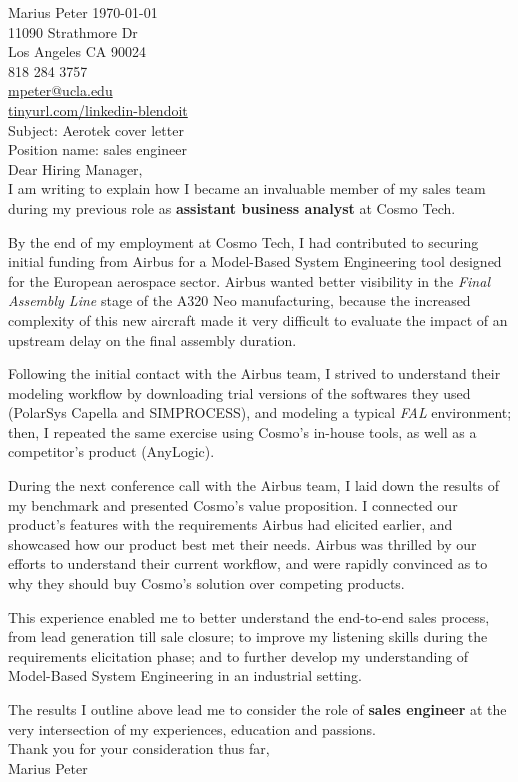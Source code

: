 \documentclass[12pt]{article}
\begin{document}
\noindent Marius Peter \hfill \today\\
11090 Strathmore Dr\\
Los Angeles CA 90024\\
818 284 3757\\
\href{mailto:mpeter@ucla.edu}{mpeter@ucla.edu}\\
\url{tinyurl.com/linkedin-blendoit}\\[0.4cm]


\noindent Subject: Aerotek cover letter\\
Position name: sales engineer\\
\vfill
Dear Hiring Manager,\\[0.4cm]

I am writing to explain how I became an invaluable member of my sales team during my previous role as \textbf{assistant business analyst} at Cosmo Tech.

By the end of my employment at Cosmo Tech, I had contributed to securing initial funding from Airbus for a Model-Based System Engineering tool designed for the European aerospace sector.
Airbus wanted better visibility in the \textit{Final Assembly Line} stage of the A320 Neo manufacturing, because the increased complexity of this new aircraft made it very difficult to evaluate the impact of an upstream delay on the final assembly duration.

Following the initial contact with the Airbus team, I strived to understand their modeling workflow by downloading trial versions of the softwares they used (PolarSys Capella and SIMPROCESS), and modeling a typical \textit{FAL} environment;
then, I repeated the same exercise using Cosmo's in-house tools, as well as a competitor's product (AnyLogic).

During the next conference call with the Airbus team, I laid down the results of my benchmark and presented Cosmo's value proposition.
I connected our product's features with the requirements Airbus had elicited earlier, and showcased how our product best met their needs.
Airbus was thrilled by our efforts to understand their current workflow, and were rapidly convinced as to why they should buy Cosmo's solution over competing products.

This experience enabled me to better understand the end-to-end sales process, from lead generation till sale closure;
to improve my listening skills during the requirements elicitation phase;
and to further develop my understanding of Model-Based System Engineering in an industrial setting. 

The results I outline above lead me to consider the role of \textbf{sales engineer} at the very intersection of my experiences, education and passions.\\[0.4cm]

Thank you for your consideration thus far,\\[0.2cm]

Marius Peter
\end{document}
